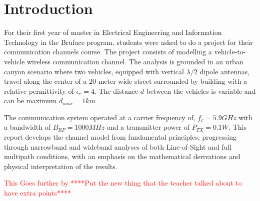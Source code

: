 \setcounter{secnumdepth}{-1}
\chapter{Introduction}
For their first year of master in Electrical Engineering and Information Technology in the Bruface program, students were asked to do a project for their communication channels course. The project consists of modelling a vehicle-to-vehicle wireless communication channel. The analysis is grounded in an urban canyon scenario where two vehicles, equipped with vertical $\lambda/2$ dipole antennas, travel along the center of a 20-meter wide street surrounded by building with a relative permittivity of $\epsilon_r=4$. The distance $d$ between the vehicles is variable and can be maximum $d_{max} = 1 km$

The communication system operated at a carrier frequency of, $f_c = 5.9 GHz$ with a bandwidth of $B_{RF} = 1000 MHz$ and a transmitter power of $P_{TX} = 0.1 W$. This report develops the channel model from fundamental principles, progressing through narrowband and wideband analyses of both Line-of-Sight and full multipath conditions, with an emphasis on the mathematical derivations and physical interpretation of the results.

\textcolor{red}{This Goes further by ****Put the new thing that the teacher talked about to have extra points****}